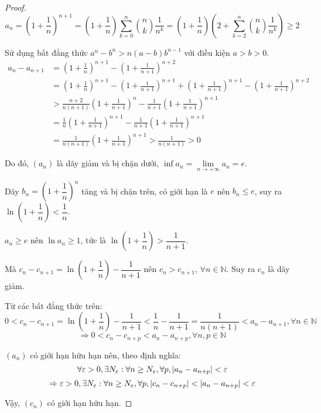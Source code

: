 \documentclass[class=analysis,crop=false]{standalone}
\begin{document}
\begin{proof}
    \[
        a_{n} = \left(1 + \frac{1}{n}\right)^{n+1} = \left(1 + \frac{1}{n}\right)\sum^{n}_{k=0}\binom{n}{k}\frac{1}{n^{k}} = \left(1 + \frac{1}{n}\right)\left(2 + \sum^{n}_{k=2}\binom{n}{k}\frac{1}{n^{k}}\right) \ge 2
    \]
    \par Sử dụng bất đẳng thức $a^{n} - b^{n} > n(a-b)b^{n-1}$ với điều kiện $a > b > 0$.
    \begin{align*}
        a_{n} - a_{n+1} & = \left(1 + \frac{1}{n}\right)^{n+1} - \left(1 + \frac{1}{n+1}\right)^{n+2} \\
                        & = \left(1 + \frac{1}{n}\right)^{n+1} - \left(1 + \frac{1}{n+1}\right)^{n+1} + \left(1 + \frac{1}{n+1}\right)^{n+1} - \left(1 + \frac{1}{n+1}\right)^{n+2} \\
                        & > \frac{n+2}{n(n+1)}\left(1 + \frac{1}{n+1}\right)^{n} - \frac{1}{n+1}\left(1 + \frac{1}{n+1}\right)^{n+1} \\
                        & = \frac{1}{n}\left(1 + \frac{1}{n+1}\right)^{n+1} - \frac{1}{n+1}\left(1 + \frac{1}{n+1}\right)^{n+1} \\
                        & = \frac{1}{n(n+1)}\left(1 + \frac{1}{n+1}\right)^{n+1} > \frac{1}{n(n+1)} > 0
    \end{align*}
    \par Do đó, $(a_{n})$ là dãy giảm và bị chặn dưới, $\inf a_{n} = \lim\limits_{n\to+\infty}a_{n} = e$.
    \par Dãy $b_{n} = \left(1 + \dfrac{1}{n}\right)^{n}$ tăng và bị chặn trên, có giới hạn là $e$ nên $b_{n} \le e$, suy ra $\ln\left(1 + \dfrac{1}{n}\right) < \dfrac{1}{n}$.
    \par $a_{n} \ge e$ nên $\ln a_{n} \ge 1$, tức là $\ln\left(1 + \dfrac{1}{n}\right) > \dfrac{1}{n+1}$.
    \par Mà $c_{n} - c_{n+1} = \ln\left(1 + \dfrac{1}{n}\right) - \dfrac{1}{n+1}$ nên $c_{n} > c_{n+1}$, $\forall n\in\mathbb{N}$. Suy ra $c_{n}$ là dãy giảm.
    \bigskip
    \par Từ các bất đẳng thức trên:
    \[
        0 < c_{n} - c_{n+1} = \ln\left(1 + \frac{1}{n}\right) - \frac{1}{n+1} < \frac{1}{n} - \frac{1}{n+1} = \frac{1}{n(n+1)} < a_{n} - a_{n+1}, \forall n\in\mathbb{N}
    \]
    \[
        \Longrightarrow 0 < c_{n} - c_{n+p} < a_{n} - a_{n+p}, \forall n, p\in\mathbb{N}
    \]
    \par $(a_{n})$ có giới hạn hữu hạn nên, theo định nghĩa:
    \[
        \forall\varepsilon > 0, \exists N_{\varepsilon}: \forall n\ge N_{\varepsilon},\forall p, \left\vert{a_{n} - a_{n+p}}\right\vert < \varepsilon
    \]
    \[
        \Rightarrow\varepsilon > 0, \exists N_{\varepsilon}: \forall n\ge N_{\varepsilon},\forall p, \left\vert{c_{n} - c_{n+p}}\right\vert < \left\vert{a_{n} - a_{n+p}}\right\vert < \varepsilon
    \]
    \par Vậy, $(c_{n})$ có giới hạn hữu hạn.
\end{proof}
\end{document}
